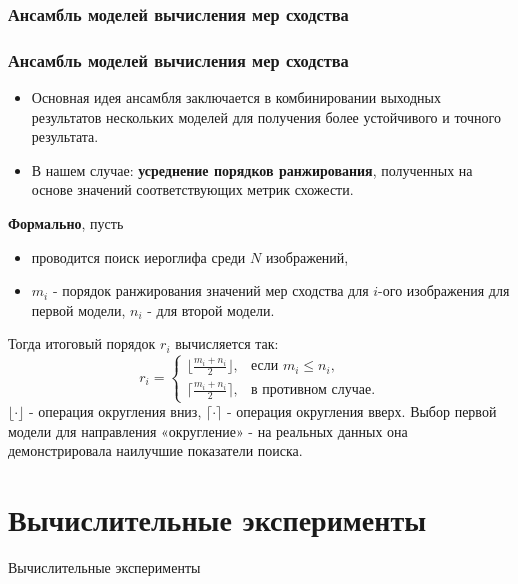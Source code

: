 \subsubsection{Ансамбль моделей вычисления мер сходства}
\begin{frame}
    \frametitle{Ансамбль моделей вычисления мер сходства}
    \begin{itemize}
        \item Основная идея ансамбля заключается в комбинировании выходных результатов нескольких моделей для получения более устойчивого и точного результата.
        \item В нашем случае: \textbf{усреднение порядков ранжирования}, полученных на основе значений соответствующих метрик схожести.
    \end{itemize}

    \textbf{Формально}, пусть
    \begin{itemize}
        \item проводится поиск иероглифа среди $N$ изображений,
        \item $m_i$ - порядок ранжирования значений мер сходства для $i$-ого изображения для первой модели, $n_i$ - для второй модели.
    \end{itemize}
    Тогда итоговый порядок $r_i$ вычисляется так:
    \[
        r_i =
        \begin{cases}
            \lfloor \frac{m_i + n_i}{2}\rfloor, & \text{если } m_i \leq n_i, \\
            \lceil \frac{m_i + n_i}{2}\rceil ,  & \text{в противном случае}.
        \end{cases}
    \]
    $\lfloor\cdot\rfloor$ - операция округления вниз, $\lceil\cdot\rceil$ - операция округления вверх.
    Выбор первой модели для направления «округление» - на реальных данных она демонстрировала наилучшие показатели поиска.

\end{frame}

\section{Вычислительные эксперименты}
\begin{frame}
    \begin{center}
        \Huge
        Вычислительные эксперименты
    \end{center}
\end{frame}

